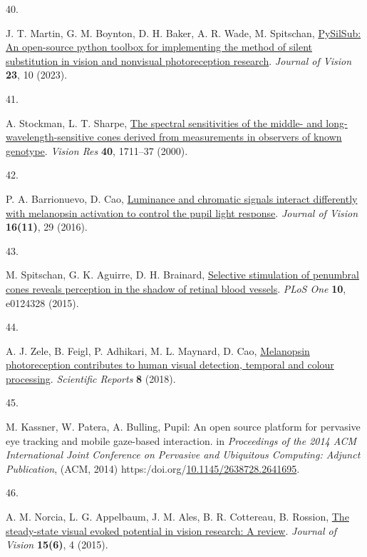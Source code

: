 \documentclass[
]{article}
\newlength{\cslhangindent}
\newlength{\csllabelwidth}
\newlength{\cslentryspacingunit} %
\newenvironment{CSLReferences}[2] %
 {%
  \setlength{\parindent}{0pt}
  \ifodd #1
  \let\oldpar\par
  \def\par{\hangindent=\cslhangindent\oldpar}
  \fi
  \setlength{\parskip}{#2\cslentryspacingunit}
 }%
 {}
\newcommand{\CSLLeftMargin}[1]{\parbox[t]{\csllabelwidth}{#1}}
\newcommand{\CSLRightInline}[1]{\parbox[t]{\linewidth - \csllabelwidth}{#1}\break}
\begin{document}
\begin{CSLReferences}{0}{0}
\leavevmode{}%
\CSLLeftMargin{40. }%
\CSLRightInline{J. T. Martin, G. M. Boynton, D. H. Baker, A. R. Wade, M. Spitschan, \href{https://doi.org/10.1167/jov.23.7.10}{PySilSub: An open-source python toolbox for implementing the method of silent substitution in vision and nonvisual photoreception research}. \emph{Journal of Vision} \textbf{23}, 10 (2023).}

\leavevmode{}%
\CSLLeftMargin{41. }%
\CSLRightInline{A. Stockman, L. T. Sharpe, \href{https://doi.org/10.1016/s0042-6989(00)00021-3}{The spectral sensitivities of the middle- and long-wavelength-sensitive cones derived from measurements in observers of known genotype}. \emph{Vision Res} \textbf{40}, 1711--37 (2000).}

\leavevmode{}%
\CSLLeftMargin{42. }%
\CSLRightInline{P. A. Barrionuevo, D. Cao, \href{https://doi.org/10.1167/16.11.29}{Luminance and chromatic signals interact differently with melanopsin activation to control the pupil light response}. \emph{Journal of Vision} \textbf{16(11)}, 29 (2016).}

\leavevmode{}%
\CSLLeftMargin{43. }%
\CSLRightInline{M. Spitschan, G. K. Aguirre, D. H. Brainard, \href{https://doi.org/10.1371/journal.pone.0124328}{Selective stimulation of penumbral cones reveals perception in the shadow of retinal blood vessels}. \emph{PLoS One} \textbf{10}, e0124328 (2015).}

\leavevmode{}%
\CSLLeftMargin{44. }%
\CSLRightInline{A. J. Zele, B. Feigl, P. Adhikari, M. L. Maynard, D. Cao, \href{https://doi.org/10.1038/s41598-018-22197-w}{Melanopsin photoreception contributes to human visual detection, temporal and colour processing}. \emph{Scientific Reports} \textbf{8} (2018).}

\leavevmode{}%
\CSLLeftMargin{45. }%
\CSLRightInline{M. Kassner, W. Patera, A. Bulling, Pupil: An open source platform for pervasive eye tracking and mobile gaze-based interaction. in \emph{Proceedings of the 2014 {ACM} International Joint Conference on Pervasive and Ubiquitous Computing: Adjunct Publication}, ({ACM}, 2014) https:/doi.org/\href{https://doi.org/10.1145/2638728.2641695}{10.1145/2638728.2641695}.}

\leavevmode{}%
\CSLLeftMargin{46. }%
\CSLRightInline{A. M. Norcia, L. G. Appelbaum, J. M. Ales, B. R. Cottereau, B. Rossion, \href{https://doi.org/10.1167/15.6.4}{The steady-state visual evoked potential in vision research: A review}. \emph{Journal of Vision} \textbf{15(6)}, 4 (2015).}


\end{CSLReferences}
\end{document}
